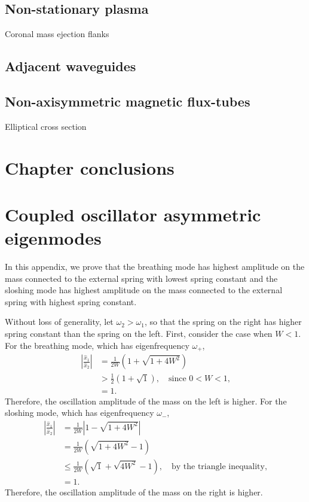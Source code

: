 \documentclass[12pt]{../style-files/ociamthesis}
\begin{document}
\subsection{Non-stationary plasma}
Coronal mass ejection flanks 
\cite{bar_etal18}


\subsection{Adjacent waveguides}
\cite{van_etal08}

\subsection{Non-axisymmetric magnetic flux-tubes}
Elliptical cross section
\cite{gu_etal80}
\cite{erd_etal09}
\cite{rud03}
\cite{mor_etal11}





\section{Chapter conclusions}
\label{sec: chpt 2 conc}
\color{black}


\appendix
\section{Coupled oscillator asymmetric eigenmodes} \label{app: coupled oscillator modes}
In this appendix, we prove that the breathing mode has highest amplitude on the mass connected to the external spring with lowest spring constant and the sloshing mode has highest amplitude on the mass connected to the external spring with highest spring constant.

Without loss of generality, let $\omega_2 > \omega_1$, so that the spring on the right has higher spring constant than the spring on the left. First, consider the case when $W < 1$. For the breathing mode, which has eigenfrequency $\omega_+$,
\begin{align}
	\left| \frac{\hat{x}_1}{\hat{x}_2} \right| & = \frac{1}{2W} \left(1 + \sqrt{1 + 4W^2}\right) \\
	& >  \frac{1}{2} \left(1 + \sqrt{1}\right), \quad \text{since $0 < W < 1$,} \\
	& = 1.
\end{align}
Therefore, the oscillation amplitude of the mass on the left is higher. For the sloshing mode, which has eigenfrequency $\omega_-$,
\begin{align}
	\left| \frac{\hat{x}_1}{\hat{x}_2} \right| & = \frac{1}{2W} \left|1 - \sqrt{1 + 4W^2}\right| \\
	& = \frac{1}{2W} \left(\sqrt{1 + 4W^2} - 1\right) \\
	& \leq \frac{1}{2W} \left(\sqrt{1} + \sqrt{4W^2} - 1\right), \quad \text{by the triangle inequality,} \\
	& = 1.
\end{align}
Therefore, the oscillation amplitude of the mass on the right is higher.
\end{document}
